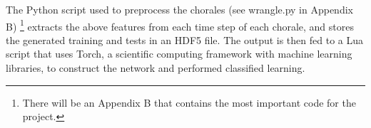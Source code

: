 \documentclass[11pt]{article}
\begin{document}
The Python script used to preprocess the chorales (see wrangle.py in Appendix B) \footnote{There will be an Appendix B that contains the most important code for the project.} extracts the above features from each time step of each chorale, and stores the generated training and tests in an HDF5 file. The output is then fed to a Lua script that uses Torch, a scientific computing framework with machine learning libraries, to construct the network and performed classified learning.  



\printbibliography
\end{document}
